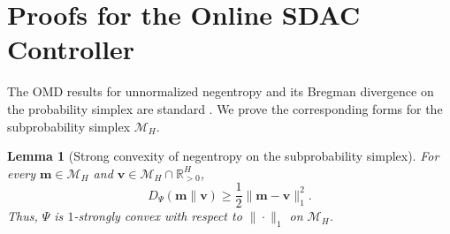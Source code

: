 \documentclass[journal]{IEEEtran}
\newtheorem{lemma}{Lemma}
\theoremstyle{remark}
\begin{document}
\section{Proofs for the Online SDAC Controller}
\label{sec:appendix-algorithm-proofs}

The OMD results for unnormalized negentropy and its Bregman divergence on the
probability simplex are standard \cite{hazan2016introduction}. We prove the
corresponding forms for the subprobability simplex $\mathcal{M}_H$.

\begin{lemma}[Strong convexity of negentropy on the subprobability simplex]
\label{lem:subprob-negentropy-strong-convexity}
For every $\mathbf{m}\in\mathcal{M}_H$ and
$\mathbf{v}\in\mathcal{M}_H\cap\mathbb{R}_{>0}^H$,
\begin{equation}
\label{eq:subprob-negentropy-strong-convexity}
D_\Psi(\mathbf{m}\|\mathbf{v})
\ge
\frac12\|\mathbf{m}-\mathbf{v}\|_1^2.
\end{equation}
Thus, $\Psi$ is $1$-strongly convex with respect to $\|\cdot\|_1$ on
$\mathcal{M}_H$.
\end{lemma}
\end{document}

